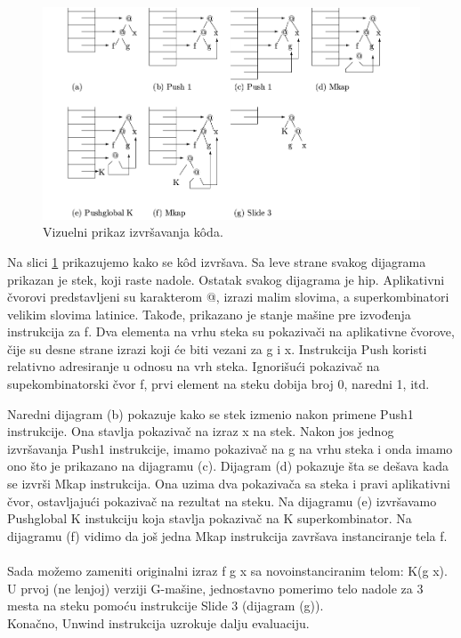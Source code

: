 \begin{figure}[h!]
	\centering
	\includegraphics[scale=0.35]{primerGmasine.png}
	
	\caption{Vizuelni prikaz izvršavanja k\^ oda.}
	\label{fig:primerGmasine}
\end{figure}

Na slici \ref{fig:primerGmasine} prikazujemo kako se k\^ od izvršava. Sa leve strane svakog dijagrama prikazan je stek, koji raste nadole. Ostatak svakog dijagrama je hip. Aplikativni čvorovi predstavljeni su karakterom @, izrazi malim slovima, a superkombinatori velikim slovima latinice. Takođe, prikazano je stanje mašine pre izvođenja instrukcija za f. Dva elementa na vrhu steka su pokazivači na aplikativne čvorove, čije su desne strane izrazi koji će biti vezani za g i x. Instrukcija Push koristi relativno adresiranje u odnosu na vrh steka. Ignorišući pokazivač na supekombinatorski čvor f, prvi element na steku dobija broj 0, naredni 1, itd.

Naredni dijagram (b) pokazuje kako se stek izmenio nakon primene Push1 instrukcije. Ona stavlja pokazivač na izraz x na stek. Nakon jos jednog izvršavanja Push1 instrukcije, imamo pokazivač na g na vrhu steka i onda imamo ono što je prikazano na dijagramu (c). Dijagram (d) pokazuje šta se dešava kada se izvrši Mkap instrukcija. Ona uzima dva pokazivača sa steka i pravi aplikativni čvor, ostavljajući pokazivač na rezultat na steku. Na dijagramu (e) izvršavamo Pushglobal K instukciju koja stavlja pokazivač na K superkombinator. Na dijagramu (f) vidimo da još jedna Mkap instrukcija završava instanciranje tela f.\\ 
\\
Sada možemo zameniti originalni izraz f g x  sa novoinstanciranim telom: K(g x). U prvoj (ne lenjoj) verziji G-mašine, jednostavno pomerimo telo nadole za 3 mesta na steku pomoću instrukcije Slide 3 (dijagram (g)).\\ Konačno, Unwind instrukcija uzrokuje dalju evaluaciju.



